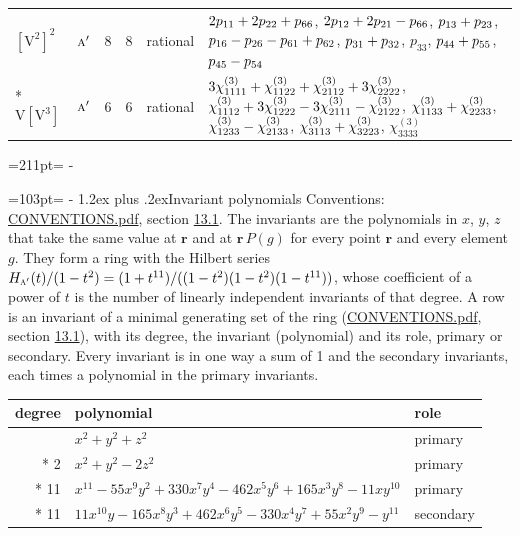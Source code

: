 \documentclass[10pt,a4paper]{article}
\makeatletter
\renewcommand\section{\@startsection{section}{1}{\z@}{-3ex plus -1ex minus -.2ex}%
  {1.2ex plus .2ex}{\normalfont\large\sffamily\bfseries\color{parttitle}}}
\newcommand{\needspace}[1]{\par\penalty-100\begingroup\dimen0=#1\relax\dimen2=\pagegoal
  \advance\dimen2-\pagetotal\ifdim\dimen0>\dimen2\relax\ifdim\dimen2>0pt\vfil\break\fi\fi
  \endgroup}
\numberwithin{equation}{section}
\newcommand{\irr}[1]{\text{\normalfont\scshape #1}}
\newcommand{\pointr}{\mathbf{r}}
\newcommand{\jahn}[1]{\mathrm{#1}}
\newlength{\fillwidth}\newlength{\cellwidth}\newlength{\colwidth}
\newcommand{\signbreak}{\penalty100\relax}
\makeatother
\begin{document}
{\begin{longtable}{@{}llrrl>{\RaggedRight\arraybackslash}p{\fillwidth}@{}}
$\jahn{[V^{2}]^{2}}$ & $\irr{a}'$ & 8 & 8 & rational & $2p_{11} +\signbreak 2p_{22} +\signbreak p_{66}$, $2p_{12} +\signbreak 2p_{21} -\signbreak p_{66}$, $p_{13} +\signbreak p_{23}$, $p_{16} -\signbreak p_{26} -\signbreak p_{61} +\signbreak p_{62}$, $p_{31} +\signbreak p_{32}$, $p_{33}$, $p_{44} +\signbreak p_{55}$, $p_{45} -\signbreak p_{54}$\\*
$\jahn{V[V^{3}]}$ & $\irr{a}'$ & 6 & 6 & rational & $3\chi^{(3)}_{1111} +\signbreak \chi^{(3)}_{1122} +\signbreak \chi^{(3)}_{2112} +\signbreak 3\chi^{(3)}_{2222}$, $\chi^{(3)}_{1112} +\signbreak 3\chi^{(3)}_{1222} -\signbreak 3\chi^{(3)}_{2111} -\signbreak \chi^{(3)}_{2122}$, $\chi^{(3)}_{1133} +\signbreak \chi^{(3)}_{2233}$, $\chi^{(3)}_{1233} -\signbreak \chi^{(3)}_{2133}$, $\chi^{(3)}_{3113} +\signbreak \chi^{(3)}_{3223}$, $\chi^{(3)}_{3333}$\\
\bottomrule\end{longtable}}
\needspace{211pt}
\needspace{103pt}
\section{Invariant polynomials}\label{s:invariant_polynomials}
Conventions: \href{../../CONVENTIONS.pdf}{CONVENTIONS.pdf}, section \href{../../CONVENTIONS.pdf\#conv.13.1}{13.1}.
The invariants are the polynomials in $x$, $y$, $z$ that take the same value at $\pointr$ and at $\pointr\,P(g)$ for every point $\pointr$ and every element $g$. They form a ring with the Hilbert series $H_{\irr{a}'}(t)/(1-t^{2}) = (1 + t^{11})/((1-t^{2})(1-t^{2})(1-t^{11}))$, whose coefficient of a power of $t$ is the number of linearly independent invariants of that degree. \label{n:head.degree}\label{n:head.role}A row is an invariant of a minimal generating set of the ring (\href{../../CONVENTIONS.pdf}{CONVENTIONS.pdf}, section \href{../../CONVENTIONS.pdf\#conv.13.1}{13.1}), with its degree, the invariant (polynomial) and its role, primary or secondary. Every invariant is in one way a sum of 1 and the secondary invariants, each times a polynomial in the primary invariants.
{\small\begin{longtable}{@{}rll@{}}\toprule
degree & polynomial & role\\\midrule\endhead
\bottomrule\endfoot\endlastfoot
2 & $x^{2} + y^{2} + z^{2}$ & primary\\*
2 & $x^{2} + y^{2} - 2z^{2}$ & primary\\*
11 & $x^{11} - 55x^{9}y^{2} + 330x^{7}y^{4} - 462x^{5}y^{6} + 165x^{3}y^{8} - 11xy^{10}$ & primary\\*
11 & $11x^{10}y - 165x^{8}y^{3} + 462x^{6}y^{5} - 330x^{4}y^{7} + 55x^{2}y^{9} - y^{11}$ & secondary\\
\bottomrule\end{longtable}}
\end{document}
